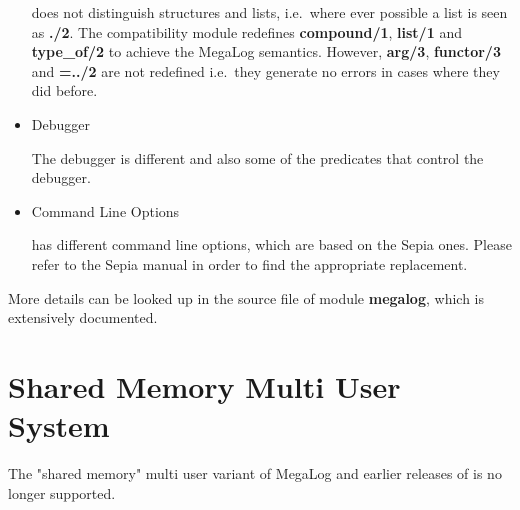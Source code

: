 \begin{itemize}
\eclipse does not distinguish structures and lists, i.e.\ where ever
possible a list is seen as {\bf ./2}. The compatibility module 
redefines {\bf compound/1}, {\bf list/1} and {\bf type\_of/2} to 
achieve the MegaLog semantics. However, {\bf arg/3}, {\bf functor/3} and
{\bf =../2} are not redefined i.e.\ they generate no errors in cases 
where they did before.

\item{Debugger}

The debugger is different and also some of the predicates that
control the debugger.

\item{Command Line Options}

\eclipse has different command line options, which are based on the
Sepia ones. Please refer to the Sepia manual in order to find the
appropriate replacement.

\end{itemize}

More details can be looked up in the source file of module
{\bf megalog}, which is extensively documented.


\section{Shared Memory Multi User System}

The "shared memory" multi user variant of MegaLog and
earlier releases of \eclipse is no longer supported.

